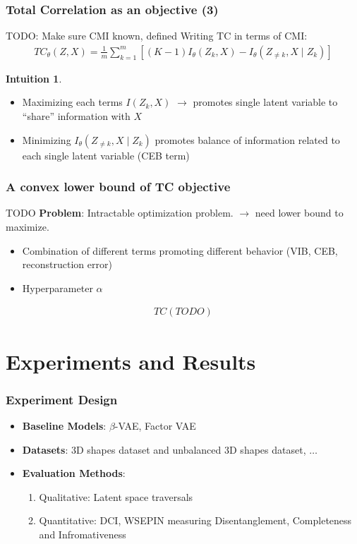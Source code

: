 \documentclass{beamer}
\theoremstyle{definition}
\newtheorem{intuition}{Intuition}
\begin{document}
    \begin{frame}
      \frametitle{Total Correlation as an objective (3)}
      TODO: Make sure CMI known, defined
      Writing TC in terms of CMI:
      \begin{align*}
        TC_{\theta}(Z, X) = \frac{1}{m}\sum_{k = 1}^{m}\left[ (K-1) I_{\theta}(Z_{k}, X) - I_{\theta}(Z_{\neq k}, X \mid Z_{k})\right]
      \end{align*}
      \begin{intuition}
       \begin{itemize}
         \item Maximizing each terms $I(Z_{k}, X)$ $\to$ promotes single latent variable to \enquote{share} information with $X$
         \item Minimizing $I_{\theta}(Z_{\neq k}, X \mid Z_{k})$ promotes balance of information related to each single latent variable (CEB term)
       \end{itemize}
      \end{intuition}
    \end{frame}

    \begin{frame}
      \frametitle{A convex lower bound of TC objective}
      TODO
      \textbf{Problem}: Intractable optimization problem. $\to$ need lower bound to maximize.
      \begin{itemize}
        \item Combination of different terms promoting different behavior (VIB, CEB, reconstruction error)
        \item Hyperparameter $\alpha$
      \end{itemize}
      \begin{align*}
        TC(TODO)
      \end{align*}
    \end{frame}


  \section{Experiments and Results}
    \begin{frame}
      \frametitle{Experiment Design}
      \begin{itemize}
        \item \textbf{Baseline Models}: $\beta$-VAE, Factor VAE
        \item \textbf{Datasets}: 3D shapes dataset and unbalanced 3D shapes dataset, $\dots$
        \item \textbf{Evaluation Methods}:
          \begin{enumerate}
            \item Qualitative: Latent space traversals
            \item Quantitative: DCI, WSEPIN measuring Disentanglement, Completeness and Infromativeness
          \end{enumerate}
      \end{itemize}
    \end{frame}
\end{document}
